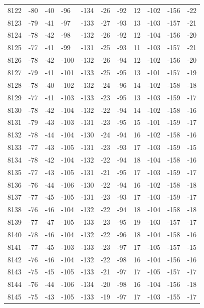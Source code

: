 \begin{table}[H]
\begin{tabular}{lllllllllll}
8122 & -80 & -40 & -96 & -134 & -26 & -92 & 12 & -102 & -156 & -22 \\
8123 & -79 & -41 & -97 & -133 & -27 & -93 & 13 & -103 & -157 & -21 \\
8124 & -78 & -42 & -98 & -132 & -26 & -92 & 12 & -104 & -156 & -20 \\
8125 & -77 & -41 & -99 & -131 & -25 & -93 & 11 & -103 & -157 & -21 \\
8126 & -78 & -42 & -100 & -132 & -26 & -94 & 12 & -102 & -156 & -20 \\
8127 & -79 & -41 & -101 & -133 & -25 & -95 & 13 & -101 & -157 & -19 \\
8128 & -78 & -40 & -102 & -132 & -24 & -96 & 14 & -102 & -158 & -18 \\
8129 & -77 & -41 & -103 & -133 & -23 & -95 & 13 & -103 & -159 & -17 \\
8130 & -78 & -42 & -104 & -132 & -22 & -94 & 14 & -102 & -158 & -16 \\
8131 & -79 & -43 & -103 & -131 & -23 & -95 & 15 & -101 & -159 & -17 \\
8132 & -78 & -44 & -104 & -130 & -24 & -94 & 16 & -102 & -158 & -16 \\
8133 & -77 & -43 & -105 & -131 & -23 & -93 & 17 & -103 & -159 & -15 \\
8134 & -78 & -42 & -104 & -132 & -22 & -94 & 18 & -104 & -158 & -16 \\
8135 & -77 & -43 & -105 & -131 & -21 & -95 & 17 & -103 & -159 & -17 \\
8136 & -76 & -44 & -106 & -130 & -22 & -94 & 16 & -102 & -158 & -18 \\
8137 & -77 & -45 & -105 & -131 & -23 & -93 & 17 & -103 & -159 & -17 \\
8138 & -76 & -46 & -104 & -132 & -22 & -94 & 18 & -104 & -158 & -18 \\
8139 & -77 & -47 & -105 & -133 & -23 & -95 & 19 & -103 & -157 & -17 \\
8140 & -78 & -46 & -104 & -132 & -22 & -96 & 18 & -104 & -158 & -16 \\
8141 & -77 & -45 & -103 & -133 & -23 & -97 & 17 & -105 & -157 & -15 \\
8142 & -76 & -46 & -104 & -132 & -22 & -98 & 16 & -104 & -156 & -16 \\
8143 & -75 & -45 & -105 & -133 & -21 & -97 & 17 & -105 & -157 & -17 \\
8144 & -76 & -44 & -106 & -134 & -20 & -98 & 16 & -104 & -156 & -18 \\
8145 & -75 & -43 & -105 & -133 & -19 & -97 & 17 & -103 & -155 & -17 \\

\end{tabular}
\end{table}
